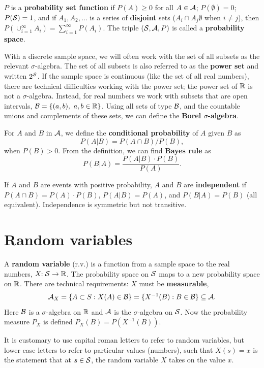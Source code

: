 \documentclass[twoside]{article}
\begin{document}
$P$ is a \textbf{probability set function} if $P(A)\geq0$ for all $A\in\mathcal{A}$; $P(\emptyset)=0$; $P(\mathcal{S})=1$,
and if $A_1,A_2,\dots$ is a series of \textbf{disjoint} sets ($A_i\cap A_j\emptyset$ when $i\neq j$), then
$P(\cup_{i=1}^\infty A_i)=\sum_{i=1}^\infty P(A_i)$. 
The triple $(\mathcal{S},\mathcal{A},P)$ is called a \textbf{probability space}.

With a discrete sample space, we will often work with the set of all subsets as the relevant 
$\sigma$-algebra. The set of all subsets is also referred to as the \textbf{power set} and written $2^{\mathcal{S}}$.
If the sample space is continuous (like the set of all real numbers), there are technical difficulties
working with the power set; the power set of $\mathbb{R}$ is not a $\sigma$-algebra. Instead, for real numbers 
we work with subsets that are open intervals, $\mathcal{B} = \{(a,b), \ a,b\in\mathbb{R}\}$. Using all sets of type $\mathcal{B}$,
and the countable unions and complements of these sets, we can define the \textbf{Borel $\sigma$-algebra}.

For $A$ and $B$ in $\mathcal{A}$, we define the \textbf{conditional probability} of $A$ given $B$
as \[ P(A|B) = P(A\cap B)/P(B),\] when $P(B)>0$. From the definition, we can find 
\textbf{Bayes rule}
as 
\[ P(B|A) = \frac{ P(A|B)\cdot P(B)}{P(A)}.\]

If $A$ and $B$ are events with positive probability, $A$ and $B$ are \textbf{independent} if
$P(A\cap B) = P(A)\cdot P(B)$, $P(A|B)=P(A)$, and $P(B|A)=P(B)$ (all equivalent). Independence
is symmetric but not transitive.

\section{Random variables}

A \textbf{random variable}  (r.v.) is a function from a sample space to the real numbers,
$X\!\!: \mathcal{S} \rightarrow \mathbb{R}$. The probability space on $\mathcal{S}$ maps to a new
probability space on $\mathbb{R}$. There are technical requirements:
$X$ must be \textbf{measurable},
\[ \mathcal{A}_X = \{A\subset S: X(A) \in \mathcal{B}\} = \{X^{-1}(B): B\in \mathcal{B}\}\subseteq \mathcal{A}.\]
Here $\mathcal{B}$ is a $\sigma$-algebra on $\mathbb{R}$ and $\mathcal{A}$ is the $\sigma$-algebra on $\mathcal{S}$.
Now the probability measure $P_X$ is defined $P_X(B) = P(X^{-1}(B))$.

It is customary to use capital roman letters to refer to random variables, but
lower case letters to refer to particular values (numbers), such that $X(s)=x$
is the statement that at $s\in\mathcal{S}$, the random variable $X$ takes on the value $x$.
\end{document}
